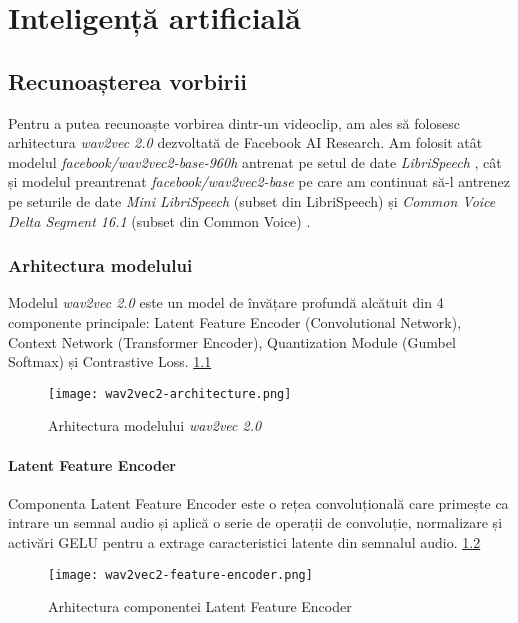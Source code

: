 \chapter{Inteligență artificială}

\section{Recunoașterea vorbirii}
Pentru a putea recunoaște vorbirea dintr-un videoclip, am ales să folosesc arhitectura
\textit{wav2vec 2.0} \cite{wav2vec2} dezvoltată de Facebook AI Research. Am folosit 
atât modelul \textit{facebook/wav2vec2-base-960h} antrenat pe setul de date 
\textit{LibriSpeech} \cite{librispeech}, cât și modelul preantrenat
\textit{facebook/wav2vec2-base} pe care am continuat să-l antrenez pe seturile
de date \textit{Mini LibriSpeech} (subset din LibriSpeech) și
\textit{Common Voice Delta Segment 16.1} (subset din Common Voice) \cite{commonvoice}.
\par

\subsection{Arhitectura modelului}
Modelul \textit{wav2vec 2.0} este un model de învățare profundă alcătuit din 4
componente principale: Latent Feature Encoder (Convolutional Network), Context 
Network (Transformer Encoder), Quantization Module (Gumbel Softmax) și 
Contrastive Loss. \ref{fig:wav2vec2-architecture}

\begin{figure}[h]
    \centering
    \texttt{[image: wav2vec2-architecture.png]}
    \caption{Arhitectura modelului \textit{wav2vec 2.0} \protect\footnotemark[1]}
    \label{fig:wav2vec2-architecture}
\end{figure}

\subsubsection{Latent Feature Encoder}
\vspace{2em}
Componenta Latent Feature Encoder este o rețea convoluțională care primește ca 
intrare un semnal audio și aplică o serie de operații de convoluție, normalizare
și activări GELU pentru a extrage caracteristici latente din semnalul audio.
\ref{fig:latent-feature-encoder}

\vspace{3em}

\begin{figure}[h]
    \centering
    \texttt{[image: wav2vec2-feature-encoder.png]}
    \caption{Arhitectura componentei Latent Feature Encoder \protect\footnotemark[1]}
    \label{fig:latent-feature-encoder}
\end{figure}


